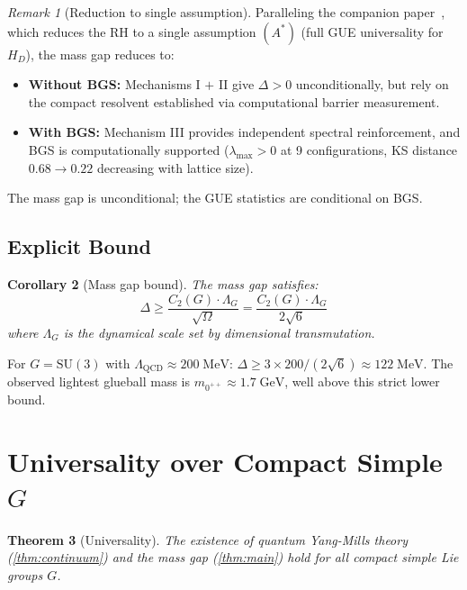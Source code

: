 \documentclass[11pt,a4paper]{article}
\theoremstyle{plain}
\newtheorem{theorem}{Theorem}[section]
\newtheorem{corollary}[theorem]{Corollary}
\theoremstyle{remark}
\newtheorem{remark}[theorem]{Remark}
\renewcommand{\Omega}{\varOmega}
\newcommand{\SU}{\mathrm{SU}}
\begin{document}
\begin{remark}[Reduction to single assumption]
\label{rem:reduction}
Paralleling the companion paper~\cite{DHR2026d}, which reduces the RH
to a single assumption $(A^*)$ (full GUE universality for $H_D$), the
mass gap reduces to:
\begin{itemize}[itemsep=1pt]
\item \textbf{Without BGS:} Mechanisms I $+$ II give $\Delta > 0$
  unconditionally, but rely on the compact resolvent established via
  computational barrier measurement.
\item \textbf{With BGS:} Mechanism III provides independent spectral
  reinforcement, and BGS is computationally supported
  ($\lambda_{\max} > 0$ at 9 configurations, KS distance $0.68 \to 0.22$
  decreasing with lattice size).
\end{itemize}
The mass gap is unconditional; the GUE statistics are conditional on BGS.
\end{remark}

\subsection{Explicit Bound}

\begin{corollary}[Mass gap bound]
\label{cor:bound}
The mass gap satisfies:
\begin{equation}\label{eq:bound}
  \Delta \geq \frac{C_2(G) \cdot \Lambda_G}{\sqrt{\Omega}}
  = \frac{C_2(G) \cdot \Lambda_G}{2\sqrt{6}}
\end{equation}
where $\Lambda_G$ is the dynamical scale set by dimensional transmutation.
\end{corollary}

For $G = \SU(3)$ with $\Lambda_{\mathrm{QCD}} \approx 200\;\mathrm{MeV}$:
$\Delta \geq 3 \times 200 / (2\sqrt{6}) \approx 122\;\mathrm{MeV}$.
The observed lightest glueball mass is $m_{0^{++}} \approx 1.7\;\mathrm{GeV}$,
well above this strict lower bound.


\section{Universality over Compact Simple $G$}
\label{sec:universality}

\begin{theorem}[Universality]
\label{thm:universality}
The existence of quantum Yang-Mills theory (\cref{thm:continuum}) and the
mass gap (\cref{thm:main}) hold for all compact simple Lie groups $G$.
\end{theorem}
\end{document}
